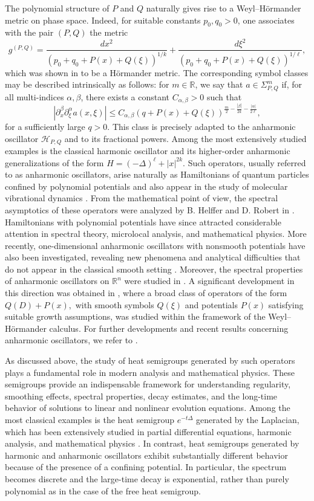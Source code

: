 \documentclass[12pt, reqno]{amsart}
\theoremstyle{definition}
\theoremstyle{remark}
\numberwithin{equation}{section}
\begin{document}
The polynomial structure of $P$ and $Q$ naturally gives rise to a Weyl--H\"ormander metric on phase space. Indeed, for suitable constants $p_0,q_0>0$, one associates with the pair $(P,Q)$ the metric
\[
g^{(P,Q)}
=
\frac{dx^2}{(p_0+q_0+P(x)+Q(\xi))^{1/k}}
+
\frac{d\xi^2}{(p_0+q_0+P(x)+Q(\xi))^{1/\ell}},
\]
which was shown in \cite{anh:cdr} to be a H\"ormander metric. The corresponding symbol classes may be described intrinsically as follows: for $m\in\mathbb{R}$, we say that $a\in \Sigma_{P,Q}^m$
if, for all multi-indices $\alpha,\beta$, there exists a constant $C_{\alpha,\beta}>0$ such that
\[
|\partial_x^\beta\partial_\xi^\alpha a(x,\xi)|
\leq
C_{\alpha,\beta}
(q+P(x)+Q(\xi))^{\frac m2-\frac{|\beta|}{2k}-\frac{|\alpha|}{2\ell}},
\]
for a sufficiently large $q>0$. This class is precisely adapted to the anharmonic oscillator $\mathcal{H}_{P,Q}$ and to its fractional powers.  Among the most extensively studied examples is the classical harmonic oscillator and its higher-order anharmonic generalizations of the form $H=(-\Delta)^{\ell}+|x|^{2k}.$
Such operators, usually referred to as anharmonic oscillators, arise naturally as Hamiltonians of quantum particles confined by polynomial potentials and also appear in the study of molecular vibrational dynamics \cite{Folland}. From the mathematical point of view, the spectral asymptotics of these operators were analyzed by B. Helffer and D. Robert in \cite{hr:sap3, hr:anosc2, hr:anosc}. Hamiltonians with polynomial potentials have since attracted considerable attention in spectral theory, microlocal analysis, and mathematical physics. More recently, one-dimensional anharmonic oscillators with nonsmooth potentials have also been investigated, revealing new phenomena and analytical difficulties that do not appear in the classical smooth setting \cite{sikora:a1}. Moreover, the spectral properties of anharmonic oscillators on $\mathbb{R}^n$ were studied in \cite{anh:cdr,Rober}. A significant development in this direction was obtained in \cite{anh:cdr2}, where a broad class of operators of the form $Q(D)+P(x),$
with smooth symbols $Q(\xi)$ and potentials $P(x)$ satisfying suitable growth assumptions, was studied within the framework of the Weyl--H\"ormander calculus. For further developments and recent results concerning anharmonic oscillators, we refer to \cite{CK,CK23,Carmona1}.

As discussed above, the study of heat semigroups generated by such operators plays a fundamental role in modern analysis and mathematical physics. These semigroups provide an indispensable framework for understanding regularity, smoothing effects, spectral properties, decay estimates, and the long-time behavior of solutions to linear and nonlinear evolution equations. Among the most classical examples is the heat semigroup $e^{-t\Delta}$ generated by the Laplacian, which has been extensively studied in partial differential equations, harmonic analysis, and mathematical physics \cite{Grafa}. In contrast, heat semigroups generated by harmonic and anharmonic oscillators exhibit substantially different behavior because of the presence of a confining potential. In particular, the spectrum becomes discrete and the large-time decay is exponential, rather than purely polynomial as in the case of the free heat semigroup.
\end{document}
